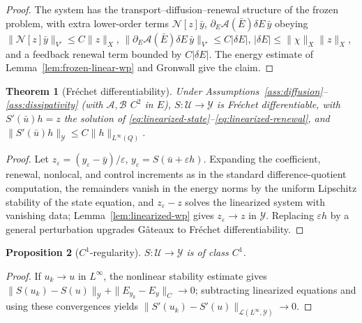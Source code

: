 \documentclass[pdflatex,sn-mathphys-num]{sn-jnl}
\theoremstyle{plain}
\newtheorem{theorem}{Theorem}[section]
\newtheorem{proposition}[theorem]{Proposition}
\theoremstyle{definition}
\theoremstyle{remark}
\begin{document}
\begin{proof}
The system has the transport--diffusion--renewal structure of the frozen
problem, with extra lower-order terms $\mathcal N[z]\bar y$,
$\partial_E \mathcal A(\bar E)\delta E\,\bar y$ obeying
$\|\mathcal N[z]\bar y\|_{V'}\le C\|z\|_X$,
$\|\partial_E \mathcal A(\bar E)\delta E\,\bar y\|_{V'}\le C|\delta E|$,
$|\delta E|\le\|\chi\|_X\|z\|_X$, and a feedback renewal term bounded by
$C|\delta E|$. The energy estimate of Lemma~\ref{lem:frozen-linear-wp} and
Gronwall give the claim.
\end{proof}

\begin{theorem}[Fr\'echet differentiability]
\label{thm:control-to-state-differentiability}
Under Assumptions~\ref{ass:diffusion}--\ref{ass:dissipativity} (with $\mathcal A, \mathcal B$
$C^2$ in $E$), $S:\mathcal U\to\mathcal Y$ is Fr\'echet differentiable, with
$S'(\bar u)h=z$ the solution of
\eqref{eq:linearized-state}--\eqref{eq:linearized-renewal}, and
$\|S'(\bar u)h\|_{\mathcal Y}\le C\|h\|_{L^\infty(Q)}$.
\end{theorem}

\begin{proof}
Let $z_\varepsilon=(y_\varepsilon-\bar y)/\varepsilon$,
$y_\varepsilon=S(\bar u+\varepsilon h)$. Expanding the coefficient, renewal,
nonlocal, and control increments as in the standard difference-quotient
computation, the remainders vanish in the energy norms by the uniform
Lipschitz stability of the state equation, and $z_\varepsilon-z$ solves the
linearized system with vanishing data; Lemma~\ref{lem:linearized-wp} gives
$z_\varepsilon\to z$ in $\mathcal Y$. Replacing $\varepsilon h$ by a general
perturbation upgrades G\^ateaux to Fr\'echet differentiability.
\end{proof}

\begin{proposition}[$C^1$-regularity]
\label{prop:C1-state-map}
$S:\mathcal U\to\mathcal Y$ is of class $C^1$.
\end{proposition}

\begin{proof}
If $u_k\to u$ in $L^\infty$, the nonlinear stability estimate gives
$\|S(u_k)-S(u)\|_{\mathcal Y}+\|E_{y_k}-E_y\|_C\to0$; subtracting linearized
equations and using these convergences yields
$\|S'(u_k)-S'(u)\|_{\mathcal L(L^\infty,\mathcal Y)}\to0$.
\end{proof}

\end{document}
